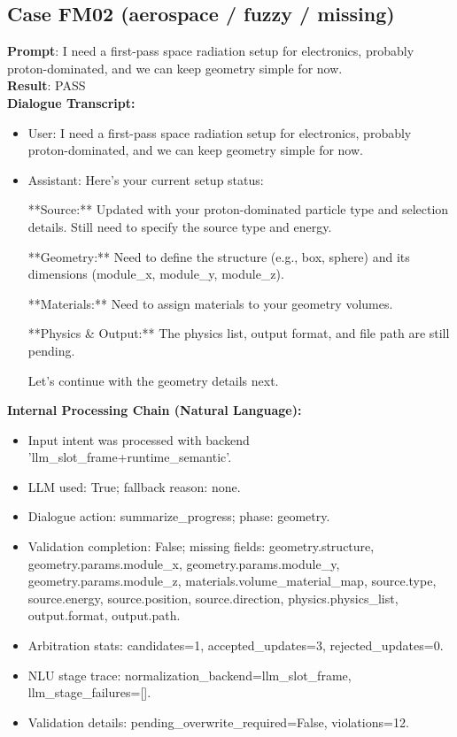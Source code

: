 \documentclass[11pt]{ctexart}
\begin{document}
\subsection{Case FM02 (aerospace / fuzzy / missing)}
\textbf{Prompt}: I need a first-pass space radiation setup for electronics, probably proton-dominated, and we can keep geometry simple for now.\\
\textbf{Result}: PASS\\
\textbf{Dialogue Transcript:}
\begin{itemize}
\item User: I need a first-pass space radiation setup for electronics, probably proton-dominated, and we can keep geometry simple for now.
\item Assistant: Here's your current setup status:

**Source:** Updated with your proton-dominated particle type and selection details. Still need to specify the source type and energy.

**Geometry:** Need to define the structure (e.g., box, sphere) and its dimensions (module\_x, module\_y, module\_z).

**Materials:** Need to assign materials to your geometry volumes.

**Physics \& Output:** The physics list, output format, and file path are still pending.

Let's continue with the geometry details next.
\end{itemize}
\textbf{Internal Processing Chain (Natural Language):}
\begin{itemize}
\item Input intent was processed with backend 'llm\_slot\_frame+runtime\_semantic'.
\item LLM used: True; fallback reason: none.
\item Dialogue action: summarize\_progress; phase: geometry.
\item Validation completion: False; missing fields: geometry.structure, geometry.params.module\_x, geometry.params.module\_y, geometry.params.module\_z, materials.volume\_material\_map, source.type, source.energy, source.position, source.direction, physics.physics\_list, output.format, output.path.
\item Arbitration stats: candidates=1, accepted\_updates=3, rejected\_updates=0.
\item NLU stage trace: normalization\_backend=llm\_slot\_frame, llm\_stage\_failures=[].
\item Validation details: pending\_overwrite\_required=False, violations=12.
\end{itemize}
\end{document}

